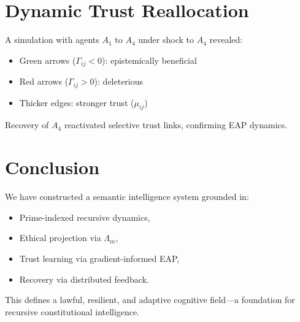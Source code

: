 \documentclass[12pt]{article}
\begin{document}
\section{Dynamic Trust Reallocation}

A simulation with agents $A_1$ to $A_4$ under shock to $A_4$ revealed:

\begin{itemize}
  \item Green arrows (\(\Gamma_{ij} < 0\)): epistemically beneficial
  \item Red arrows (\(\Gamma_{ij} > 0\)): deleterious
  \item Thicker edges: stronger trust ($\mu_{ij}$)
\end{itemize}

Recovery of $A_4$ reactivated selective trust links, confirming EAP dynamics.

\section{Conclusion}

We have constructed a semantic intelligence system grounded in:

\begin{itemize}
  \item Prime-indexed recursive dynamics,
  \item Ethical projection via $\Lambda_m$,
  \item Trust learning via gradient-informed EAP,
  \item Recovery via distributed feedback.
\end{itemize}

This defines a lawful, resilient, and adaptive cognitive field—a foundation for recursive constitutional intelligence.
\end{document}
